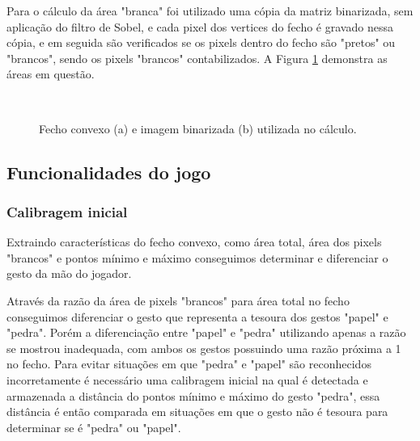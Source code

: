\documentclass[12pt]{article}
\begin{document}
Para o cálculo da área "branca" foi utilizado uma cópia da matriz binarizada, sem aplicação do filtro de Sobel, e cada pixel dos vertices do fecho é gravado nessa cópia, e em seguida são verificados se os pixels dentro do fecho são "pretos" ou "brancos", sendo os pixels "brancos" contabilizados. A Figura \ref{fig6} demonstra as áreas em questão.

\begin{figure}[H]
\centering
\mbox{\quad
{}}
\caption{ Fecho convexo (a) e imagem binarizada (b) utilizada no cálculo.}
\label{fig6}
\end{figure}

\subsection{Funcionalidades do jogo}

\subsubsection{Calibragem inicial}

Extraindo características do fecho convexo, como área total, área dos pixels "brancos" e pontos mínimo e máximo conseguimos determinar e diferenciar o gesto da mão do jogador.

Através da razão da área de pixels "brancos" para área total no fecho conseguimos diferenciar o gesto que representa a tesoura dos gestos "papel" e "pedra". Porém a diferenciação entre "papel" e "pedra" utilizando apenas a razão se mostrou inadequada, com ambos os gestos possuindo uma razão próxima a 1 no fecho. Para evitar situações em que "pedra" e "papel" são reconhecidos incorretamente é necessário uma calibragem inicial na qual é detectada e armazenada a distância do pontos mínimo e máximo do gesto "pedra", essa distância é então comparada em situações em que o gesto não é tesoura para determinar se é "pedra" ou "papel".
\end{document}

